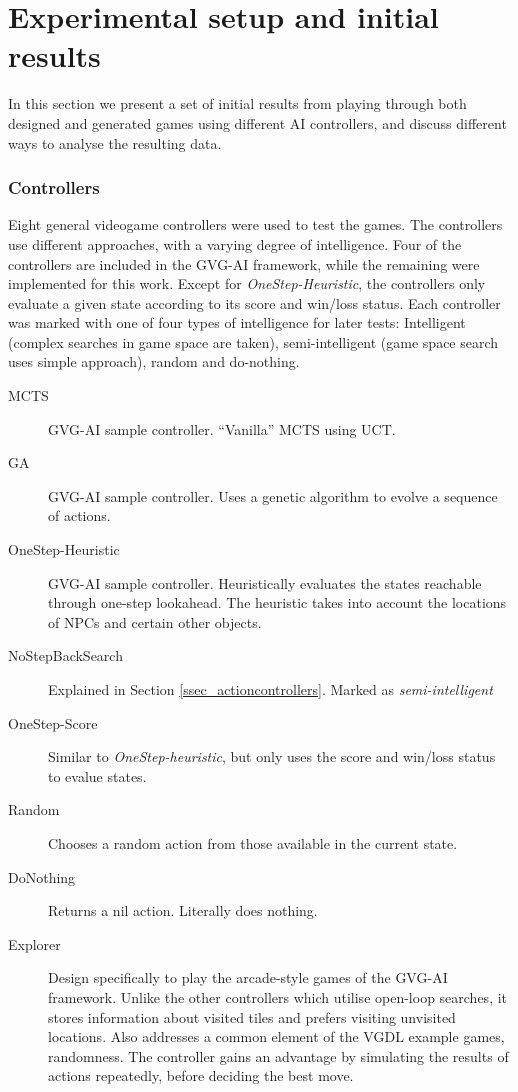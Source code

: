 \documentclass[a4paper,titlepage,final, twoside]{report}
\begin{document}
\section{Experimental setup and initial results}
In this section we present a set of initial results from playing through both designed and generated games using different AI controllers, and discuss different ways to analyse the resulting data.


\subsubsection*{Controllers}
Eight general videogame controllers were used to test the games. The controllers use different approaches, with a varying degree of intelligence. Four of the controllers are included in the GVG-AI framework, while the remaining were implemented for this work. Except for \emph{OneStep-Heuristic}, the controllers only evaluate a given state according to its score and win/loss status.
Each controller was marked with one of four types of intelligence for later tests: Intelligent (complex searches in game space are taken), semi-intelligent (game space search uses simple approach), random and do-nothing.

\begin{description}
	\item [MCTS] GVG-AI sample controller. ``Vanilla'' MCTS using UCT.
	\item [GA] GVG-AI sample controller. Uses a genetic algorithm to evolve a sequence of actions.
	\item [OneStep-Heuristic] GVG-AI sample controller. Heuristically evaluates the states reachable through one-step lookahead. The heuristic takes into account the locations of NPCs and certain other objects.
	\item [NoStepBackSearch] Explained in Section \ref{ssec_actioncontrollers}. Marked as \textit{semi-intelligent}
    \item [OneStep-Score] Similar to \emph{OneStep-heuristic}, but only uses the score and win/loss status to evalue states.
    \item [Random] Chooses a random action from those available in the current state.
	\item [DoNothing] Returns a nil action. Literally does nothing.
	\item [Explorer] Design specifically to play the arcade-style games of the GVG-AI framework. Unlike the other controllers which utilise open-loop searches, it stores information about visited tiles and prefers visiting unvisited locations. Also addresses a common element of the VGDL example games, randomness. The controller gains an advantage by simulating the results of actions repeatedly, before deciding the best move.
\end{description}
\end{document}

